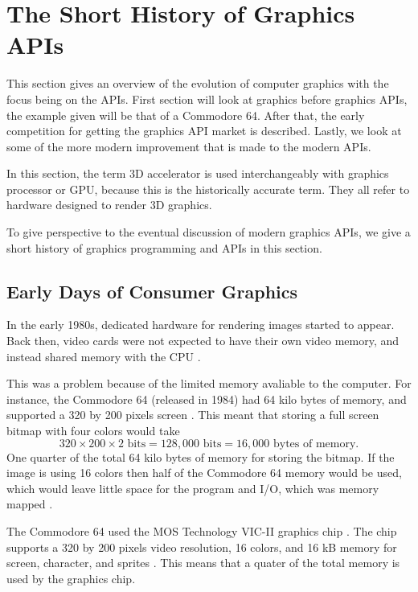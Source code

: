 \section{The Short History of Graphics \acs{API}s}\label{sec:short_history}
\begin{sectionmeta}
	This section gives an overview of the evolution of computer graphics with the focus being on the \glspl{API}.
	First section will look at graphics before graphics \glspl{API}, the example given will be that of a Commodore 64.
	After that, the early competition for getting the graphics \gls{API} market is described.
	Lastly, we look at some of the more modern improvement that is made to the modern \glspl{API}.
	
	In this section, the term 3D accelerator is used interchangeably with graphics processor or \gls{GPU}, because this is the historically accurate term. 
	They all refer to hardware designed to render 3D graphics.
\end{sectionmeta}

To give perspective to the eventual discussion of modern graphics \glspl{API}, we give a short history of graphics programming and \glspl{API} in this section.

\subsection{Early Days of Consumer Graphics}

In the early 1980s, dedicated hardware for rendering images started to appear.
Back then, video cards were not expected to have their own video memory, and instead shared memory with the \gls{CPU} \cite{wikipedia????shared}.

This was a problem because of the limited memory avaliable to the computer.
For instance, the Commodore 64 (released in 1984) had 64 kilo bytes of memory, and supported a 320 by 200 pixels screen \cite{commodore1983commodore}.
This meant that storing a full screen bitmap with four colors would take $$320\times 200\times 2 \text{ bits} = 128,000 \text{ bits} = 16,000 \text{ bytes of memory.}$$
One quarter of the total 64 kilo bytes of memory for storing the bitmap.
If the image is using 16 colors then half of the Commodore 64 memory would be used, which would leave little space for the program and I/O, which was memory mapped \cite{commodore1983commodore}.

The Commodore 64 used the MOS Technology VIC-II graphics chip \cite{commodore1983commodore}.
The chip supports a 320 by 200 pixels video resolution, 16 colors, and 16 kB memory for screen, character, and sprites \cite{commodore1983commodore}.
This means that a quater of the total memory is used by the graphics chip.

